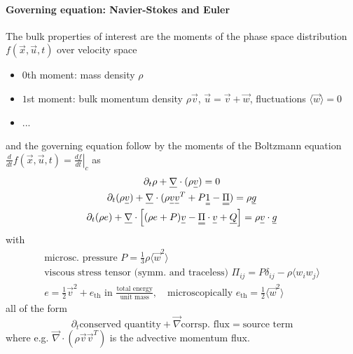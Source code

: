 \paragraph*{Governing equation: Navier-Stokes and Euler} The bulk properties of interest
are the moments of the phase space distribution $f(\vec{x}, \vec{u}, t)$ over velocity
space
\begin{itemize}
    \item $0$th moment: mass density $\rho$
    \item $1$st moment: bulk momentum density $\rho \vec{v}$, $\vec{u} = \vec{v} + \vec{w}$, fluctuations $\langle \vec{w} \rangle = 0$
    \item ...
\end{itemize}
and the governing equation follow by the moments of the Boltzmann equation $\frac{d}{dt}f(\vec{x}, \vec{u}, t) = \left. \frac{df}{dt} \right|_c$ as
\begin{equation}
    \begin{gathered}
        \partial_t \rho + \vec{\nabla} \cdot (\rho \vec{v}) = 0 \\
        \partial_t (\rho \vec{v}) + \vec{\nabla} \cdot (\rho \vec{v}\vec{v}^T + P\mat{1} - \mat{\Pi}) = \rho \vec{g} \\
        \partial_t (\rho e) + \vec{\nabla} \cdot \left[(\rho e + P)\vec{v} - \mat{\Pi} \cdot \vec{v} + \vec{Q} \right] = \rho \vec{v} \cdot \vec{g} \\
    \end{gathered}
\end{equation}
with
\begin{equation}
    \begin{gathered}
        \text{microsc. pressure } P = \frac{1}{3} \rho \langle \vec{w}^2 \rangle \\
        \text{viscous stress tensor (symm. and traceless) } \Pi_{ij} = P \delta_{ij} - \rho \langle w_i w_j \rangle \\
        e = \frac{1}{2} \vec{v}^2 + e_{\text{th}} \text{ in } \frac{\text{total energy}}{\text{unit mass}}, \quad \text{microscopically } e_{\text{th}} = \frac{1}{2} \langle \vec{w}^2 \rangle
    \end{gathered}
\end{equation}
all of the form
\begin{equation}
    \partial_t\text{conserved quantity} + \vec{\nabla}\text{corrsp. flux} = \text{source term}
\end{equation}
where e.g. $\vec{\nabla} \cdot (\rho \vec{v}\vec{v}^T)$ is the advective momentum flux.


